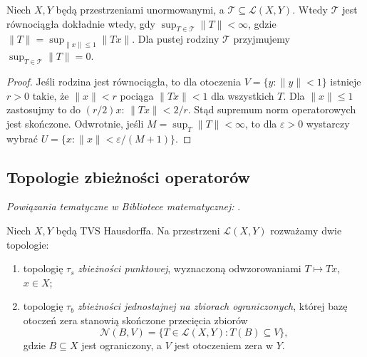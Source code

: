 \begin{stwierdzenie}
\label{prop:equi-normed}
Niech $X,Y$ będą przestrzeniami unormowanymi, a
$\mathcal T\subseteq\mathcal L(X,Y)$. Wtedy $\mathcal T$
jest równociągła dokładnie wtedy, gdy
$\sup_{T\in\mathcal T}\|T\|<\infty$,
gdzie $\|T\|=\sup_{\|x\|\le1}\|Tx\|$.
Dla pustej rodziny $\mathcal T$ przyjmujemy
$\sup_{T\in\mathcal T}\|T\|=0$.
\end{stwierdzenie}
\begin{proof}
Jeśli rodzina jest równociągła, to dla otoczenia
$V=\{y:\|y\|<1\}$ istnieje $r>0$ takie, że
$\|x\|<r$ pociąga $\|Tx\|<1$ dla wszystkich $T$.
Dla $\|x\|\le1$ zastosujmy to do $(r/2)x$:
$\|Tx\|<2/r$. Stąd supremum norm operatorowych jest
skończone.
Odwrotnie, jeśli $M=\sup_T\|T\|<\infty$, to dla
$\varepsilon>0$ wystarczy wybrać
$U=\{x:\|x\|<\varepsilon/(M+1)\}$.
\end{proof}

\subsection{Topologie zbieżności operatorów}

\noindent\emph{Powiązania tematyczne w Bibliotece matematycznej:} .


\begin{definicja}
\label{def:operator-topologies}
Niech $X,Y$ będą TVS Hausdorffa. Na przestrzeni
$\mathcal L(X,Y)$ rozważamy dwie topologie:
\begin{enumerate}[label=\textup{(\roman*)}]
\item topologię $\tau_s$ \emph{zbieżności punktowej},
wyznaczoną odwzorowaniami $T\mapsto Tx$, $x\in X$;
\item topologię $\tau_b$ \emph{zbieżności jednostajnej na
zbiorach ograniczonych}, której bazę otoczeń zera
stanowią skończone przecięcia zbiorów
\[
 \mathcal N(B,V)=\{T\in\mathcal L(X,Y):T(B)\subseteq V\},
\]
gdzie $B\subseteq X$ jest ograniczony, a $V$ jest
otoczeniem zera w $Y$.
\end{enumerate}
\end{definicja}

